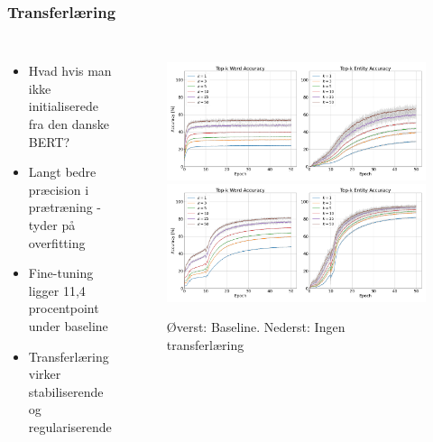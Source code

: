 \documentclass{beamer}
\begin{document}
\begin{frame}
    \frametitle{Transferlæring}
    \begin{columns}
        \begin{itemize}
            \item Hvad hvis man ikke initialiserede fra den danske BERT?
            \item Langt bedre præcision i prætræning - tyder på overfitting
            \item Fine-tuning ligger 11,4 procentpoint under baseline
            \item Transferlæring virker stabiliserende og regulariserende
        \end{itemize}
        \begin{figure}[H]
            \centering
            \includegraphics[width=.85\textwidth]{baseline-acc}
            \includegraphics[width=.85\textwidth]{nobert-acc}
            \caption{Øverst: Baseline. Nederst: Ingen transferlæring}
        \end{figure}\noindent
    \end{columns}
\end{frame}
\end{document}
